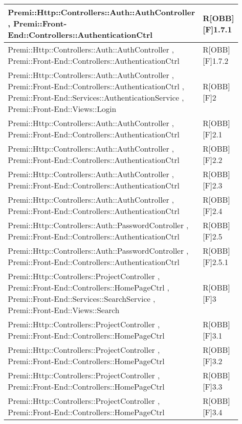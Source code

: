 \begin{table}[h]
	\begin{center}
		\begin{tabular}{|p{0.75\linewidth}|p{0.2\linewidth}|}
			\toprule
			Premi::Http::Controllers::Auth::AuthController , Premi::Front-End::Controllers::AuthenticationCtrl & R[OBB][F]1.7.1 \\
		\midrule
			Premi::Http::Controllers::Auth::AuthController , Premi::Front-End::Controllers::AuthenticationCtrl & R[OBB][F]1.7.2 \\
		\midrule
			Premi::Http::Controllers::Auth::AuthController , Premi::Front-End::Controllers::AuthenticationCtrl , Premi::Front-End::Services::AuthenticationService , Premi::Front-End::Views::Login & R[OBB][F]2 \\
		\midrule
			Premi::Http::Controllers::Auth::AuthController , Premi::Front-End::Controllers::AuthenticationCtrl & R[OBB][F]2.1 \\
		\midrule
			Premi::Http::Controllers::Auth::AuthController , Premi::Front-End::Controllers::AuthenticationCtrl & R[OBB][F]2.2 \\
		\midrule
			Premi::Http::Controllers::Auth::AuthController , Premi::Front-End::Controllers::AuthenticationCtrl & R[OBB][F]2.3 \\
		\midrule
			Premi::Http::Controllers::Auth::AuthController , Premi::Front-End::Controllers::AuthenticationCtrl & R[OBB][F]2.4 \\
		\midrule
			Premi::Http::Controllers::Auth::PasswordController , Premi::Front-End::Controllers::AuthenticationCtrl & R[OBB][F]2.5 \\
		\midrule
			Premi::Http::Controllers::Auth::PasswordController , Premi::Front-End::Controllers::AuthenticationCtrl & R[OBB][F]2.5.1 \\
		\midrule
			Premi::Http::Controllers::ProjectController , Premi::Front-End::Controllers::HomePageCtrl , Premi::Front-End::Services::SearchService , Premi::Front-End::Views::Search & R[OBB][F]3 \\
		\midrule
			Premi::Http::Controllers::ProjectController , Premi::Front-End::Controllers::HomePageCtrl & R[OBB][F]3.1 \\
		\midrule
			Premi::Http::Controllers::ProjectController , Premi::Front-End::Controllers::HomePageCtrl & R[OBB][F]3.2 \\
		\midrule
			Premi::Http::Controllers::ProjectController , Premi::Front-End::Controllers::HomePageCtrl & R[OBB][F]3.3 \\
		\midrule
			Premi::Http::Controllers::ProjectController , Premi::Front-End::Controllers::HomePageCtrl & R[OBB][F]3.4 \\

\end{tabular}
\end{center}
\end{table}
